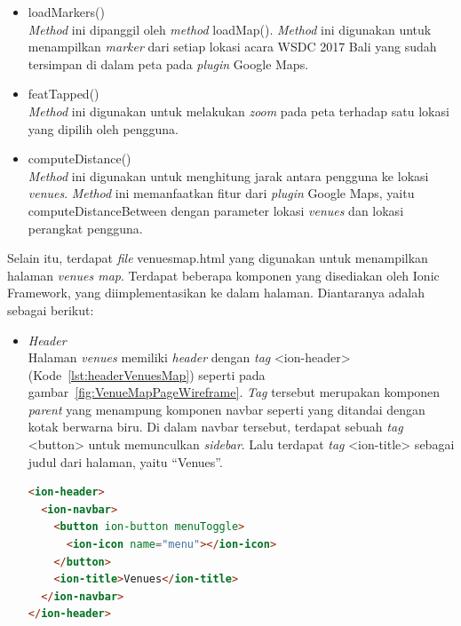 \begin{itemize}
\begin{itemize}
		\item loadMarkers() \\
		\textit{Method} ini dipanggil oleh \textit{method} loadMap(). \textit{Method} ini digunakan untuk menampilkan \textit{marker} dari setiap lokasi acara WSDC 2017 Bali yang sudah tersimpan di dalam peta pada \textit{plugin} Google Maps.  
		
		\item featTapped() \\
		\textit{Method} ini digunakan untuk melakukan \textit{zoom} pada peta terhadap satu lokasi yang dipilih oleh pengguna. 
		
		\item computeDistance()\\
		\textit{Method} ini digunakan untuk menghitung jarak antara pengguna ke lokasi \textit{venues}. \textit{Method} ini memanfaatkan fitur dari \textit{plugin} Google Maps, yaitu computeDistanceBetween dengan parameter lokasi \textit{venues} dan lokasi perangkat pengguna.
	\end{itemize}
	
	Selain itu, terdapat \textit{file} venues\textunderscore map.html yang digunakan untuk menampilkan halaman \textit{venues map}. Terdapat beberapa komponen yang disediakan oleh Ionic Framework, yang diimplementasikan ke dalam halaman. Diantaranya adalah sebagai berikut:

\newpage	
	
	\begin{itemize}
		\item \textit{Header} \\
		 Halaman \textit{venues} memiliki \textit{header} dengan \textit{tag} <ion-header> (Kode~\ref{lst:headerVenuesMap}) seperti pada gambar~\ref{fig:VenueMapPageWireframe}. \textit{Tag} tersebut merupakan komponen \textit{parent} yang menampung komponen navbar seperti yang ditandai dengan kotak berwarna biru. Di dalam navbar tersebut, terdapat sebuah \textit{tag} <button> untuk memunculkan \textit{sidebar}. Lalu terdapat \textit{tag} <ion-title> sebagai judul dari halaman, yaitu ``Venues''.
		
\begin{lstlisting}[language=html, label={lst:headerVenuesMap}, caption=\textit{Header} pada venues\textunderscore map.html]
<ion-header>
  <ion-navbar>
    <button ion-button menuToggle>
      <ion-icon name="menu"></ion-icon>
    </button>
    <ion-title>Venues</ion-title>
  </ion-navbar>
</ion-header>
\end{lstlisting}


\end{itemize}
\end{itemize}
